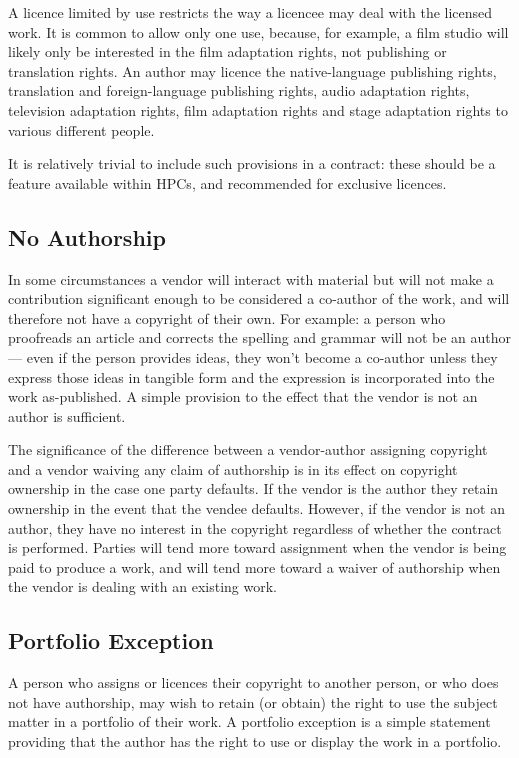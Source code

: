 \documentclass[a4paper,12pt]{article}
\begin{document}
A licence limited by use restricts the way a licencee may deal with the licensed work. It is common to allow only one use, because, for example, a film studio will likely only be interested in the film adaptation rights, not publishing or translation rights. An author may licence the native-language publishing rights, translation and foreign-language publishing rights, audio adaptation rights, television adaptation rights, film adaptation rights and stage adaptation rights to various different people.

It is relatively trivial to include such provisions in a contract: these should be a feature available within HPCs, and recommended for exclusive licences.

\subsection{No Authorship}

In some circumstances a vendor will interact with material but will not make a contribution significant enough to be considered a co-author of the work, and will therefore not have a copyright of their own. For example: a person who proofreads an article and corrects the spelling and grammar will not be an author --- even if the person provides ideas, they won't become a co-author unless they express those ideas in tangible form and the expression is incorporated into the work as-published. A simple provision to the effect that the vendor is not an author is sufficient.

The significance of the difference between a vendor-author assigning copyright and a vendor waiving any claim of authorship is in its effect on copyright ownership in the case one party defaults. If the vendor is the author they retain ownership in the event that the vendee defaults. However, if the vendor is not an author, they have no interest in the copyright regardless of whether the contract is performed. Parties will tend more toward assignment when the vendor is being paid to produce a work, and will tend more toward a waiver of authorship when the vendor is dealing with an existing work.

\subsection{Portfolio Exception}

A person who assigns or licences their copyright to another person, or who does not have authorship, may wish to retain (or obtain) the right to use the subject matter in a portfolio of their work. A portfolio exception is a simple statement providing that the author has the right to use or display the work in a portfolio.
\end{document}
